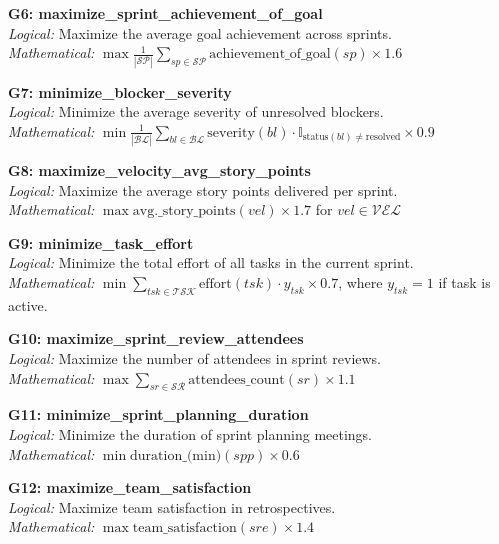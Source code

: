 \documentclass[12pt]{article}
\begin{document}
    \item \textbf{G6: maximize\_sprint\_achievement\_of\_goal} \\
    \textit{Logical:} Maximize the average goal achievement across sprints. \\
    \textit{Mathematical:} $ \max \frac{1}{|\mathcal{SP}|} \sum_{sp \in \mathcal{SP}} \text{achievement\_of\_goal}(sp) \times 1.6 $

    \item \textbf{G7: minimize\_blocker\_severity} \\
    \textit{Logical:} Minimize the average severity of unresolved blockers. \\
    \textit{Mathematical:} $ \min \frac{1}{|\mathcal{BL}|} \sum_{bl \in \mathcal{BL}} \text{severity}(bl) \cdot \mathbb{I}_{\text{status}(bl) \neq \text{resolved}} \times 0.9 $

    \item \textbf{G8: maximize\_velocity\_avg\_story\_points} \\
    \textit{Logical:} Maximize the average story points delivered per sprint. \\
    \textit{Mathematical:} $ \max \text{avg.\_story\_points}(vel) \times 1.7 $ for $ vel \in \mathcal{VEL} $

    \item \textbf{G9: minimize\_task\_effort} \\
    \textit{Logical:} Minimize the total effort of all tasks in the current sprint. \\
    \textit{Mathematical:} $ \min \sum_{tsk \in \mathcal{TSK}} \text{effort}(tsk) \cdot y_{tsk} \times 0.7 $, where $ y_{tsk} = 1 $ if task is active.

    \item \textbf{G10: maximize\_sprint\_review\_attendees} \\
    \textit{Logical:} Maximize the number of attendees in sprint reviews. \\
    \textit{Mathematical:} $ \max \sum_{sr \in \mathcal{SR}} \text{attendees\_count}(sr) \times 1.1 $

    \item \textbf{G11: minimize\_sprint\_planning\_duration} \\
    \textit{Logical:} Minimize the duration of sprint planning meetings. \\
    \textit{Mathematical:} $ \min \text{duration\_(min)}(spp) \times 0.6 $

    \item \textbf{G12: maximize\_team\_satisfaction} \\
    \textit{Logical:} Maximize team satisfaction in retrospectives. \\
    \textit{Mathematical:} $ \max \text{team\_satisfaction}(sre) \times 1.4 $
\end{document}
